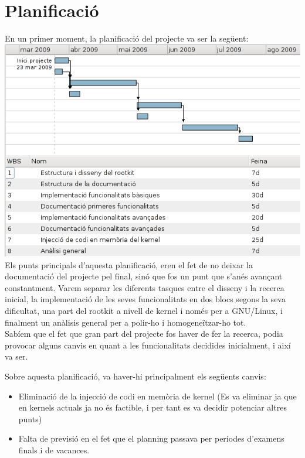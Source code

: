 \chapter{Planificació}

En un primer moment, la planificació del projecte va ser la següent: \\

\includegraphics[scale=0.7,keepaspectratio]{primer_gantt.png} \\

Els punts principals d'aquesta planificació, eren el fet de no deixar la documentació del projecte pel final, 
sinó que fos un punt que s'anés avançant constantment. Varem separar les diferents tasques entre el disseny
i la recerca inicial, la implementació de les seves funcionalitats en dos blocs segons la seva dificultat,
una part del rootkit a nivell de kernel i només per a GNU/Linux, i finalment un anàlisis general per a polir-ho
i homogeneïtzar-ho tot. \\

Sabíem que el fet que gran part del projecte fos haver de fer la recerca, podia provocar alguns canvis en quant a
les funcionalitats decidides inicialment, i així va ser.

Sobre aquesta planificació, va haver-hi principalment els següents canvis:

\begin{itemize}
    \item Eliminació de la injecció de codi en memòria de kernel (Es va eliminar ja que en kernels actuals ja no 
        és factible, i per tant es va decidir potenciar altres punts)
    \item Falta de previsió en el fet que el planning passava per períodes d'examens finals i de vacances.
\end{itemize}

